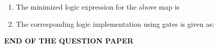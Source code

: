 \documentclass[14pt, a4paper]{extarticle}
\begin{document}
\begin{enumerate}[label=\textbf{Q. \arabic*}, start=59]

\item The minimized logic expression for the above map is
    \begin{enumerate}
    \end{enumerate}

\item The corresponding logic implementation using gates is given as:
    \begin{enumerate}
    \end{enumerate}

\end{enumerate}

\begin{center}
    \Large\textbf{END OF THE QUESTION PAPER}
\end{center}
\end{document}

